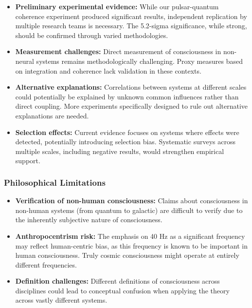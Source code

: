 \documentclass[12pt]{article}
\begin{document}
\begin{itemize}
    \item \textbf{Preliminary experimental evidence:} While our pulsar-quantum coherence experiment produced significant results, independent replication by multiple research teams is necessary. The 5.2-sigma significance, while strong, should be confirmed through varied methodologies.
    
    \item \textbf{Measurement challenges:} Direct measurement of consciousness in non-neural systems remains methodologically challenging. Proxy measures based on integration and coherence lack validation in these contexts.
    
    \item \textbf{Alternative explanations:} Correlations between systems at different scales could potentially be explained by unknown common influences rather than direct coupling. More experiments specifically designed to rule out alternative explanations are needed.
    
    \item \textbf{Selection effects:} Current evidence focuses on systems where effects were detected, potentially introducing selection bias. Systematic surveys across multiple scales, including negative results, would strengthen empirical support.
\end{itemize}

\subsubsection{Philosophical Limitations}

\begin{itemize}
    \item \textbf{Verification of non-human consciousness:} Claims about consciousness in non-human systems (from quantum to galactic) are difficult to verify due to the inherently subjective nature of consciousness.
    
    \item \textbf{Anthropocentrism risk:} The emphasis on 40 Hz as a significant frequency may reflect human-centric bias, as this frequency is known to be important in human consciousness. Truly cosmic consciousness might operate at entirely different frequencies.
    
    \item \textbf{Definition challenges:} Different definitions of consciousness across disciplines could lead to conceptual confusion when applying the theory across vastly different systems.
\end{itemize}
\end{document}
